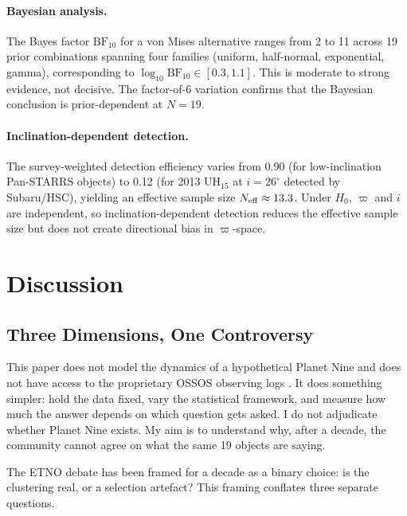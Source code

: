 \documentclass[usenatbib]{mnras}
\begin{document}
\paragraph{Bayesian analysis.}
The Bayes factor $\mathrm{BF}_{10}$ for a von Mises alternative ranges from 2 to 11 across 19 prior combinations spanning four families (uniform, half-normal, exponential, gamma), corresponding to $\log_{10}\mathrm{BF}_{10}\in[0.3,1.1]$. This is moderate to strong evidence, not decisive. The factor-of-6 variation confirms that the Bayesian conclusion is prior-dependent at $N=19$.

\paragraph{Inclination-dependent detection.}
The survey-weighted detection efficiency varies from 0.90 (for low-inclination Pan-STARRS objects) to 0.12 (for 2013 UH$_{15}$ at $i=26^\circ$ detected by Subaru/HSC), yielding an effective sample size $N_{\rm eff}\approx13.3$. Under $H_0$, $\varpi$ and $i$ are independent, so inclination-dependent detection reduces the effective sample size but does not create directional bias in $\varpi$-space.

\section{Discussion}

\subsection{Three Dimensions, One Controversy}

This paper does not model the dynamics of a hypothetical Planet Nine \cite{batygin2016,brown2019} and does not have access to the proprietary OSSOS observing logs \cite{shankman2017,napier2021}. It does something simpler: hold the data fixed, vary the statistical framework, and measure how much the answer depends on which question gets asked. I do not adjudicate whether Planet Nine exists. My aim is to understand why, after a decade, the community cannot agree on what the same 19 objects are saying.

The ETNO debate has been framed for a decade as a binary choice: is the clustering real, or a selection artefact? This framing conflates three separate questions.
\end{document}
